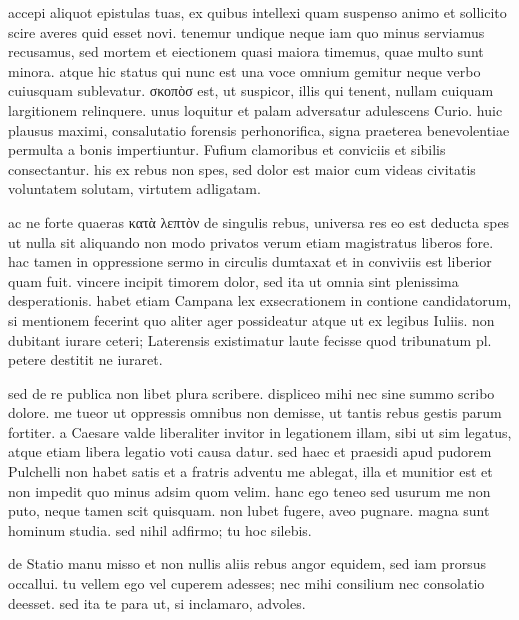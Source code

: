 


 accepi aliquot epistulas tuas, ex quibus intellexi quam suspenso animo et sollicito scire averes quid esset novi. tenemur undique neque iam quo minus serviamus recusamus, sed mortem et eiectionem quasi maiora timemus, quae multo sunt minora. atque hic status qui nunc est una voce omnium gemitur neque verbo cuiusquam sublevatur. σκοπὸσ est, ut suspicor, illis qui tenent, nullam cuiquam largitionem relinquere. unus loquitur et palam adversatur adulescens Curio. huic plausus maximi, consalutatio forensis perhonorifica, signa praeterea benevolentiae permulta a bonis impertiuntur. Fufium clamoribus et conviciis et sibilis consectantur. his ex rebus non spes, sed dolor est maior cum videas civitatis voluntatem solutam, virtutem adligatam.

 ac ne forte quaeras κατὰ λεπτὸν de singulis rebus, universa res eo est deducta spes ut nulla sit aliquando non modo privatos verum etiam magistratus liberos fore. hac tamen in oppressione sermo in circulis dumtaxat et in conviviis est liberior quam fuit. vincere incipit timorem dolor, sed ita ut omnia sint plenissima desperationis. habet etiam Campana lex exsecrationem in contione candidatorum, si mentionem fecerint quo aliter ager possideatur atque ut ex legibus Iuliis. non dubitant iurare ceteri; Laterensis existimatur laute fecisse quod tribunatum pl. petere destitit ne iuraret.

 sed de re publica non libet plura scribere. displiceo mihi nec sine summo scribo dolore. me tueor ut oppressis omnibus non demisse, ut tantis rebus gestis parum fortiter. a Caesare valde liberaliter invitor in legationem illam, sibi ut sim legatus, atque etiam libera legatio voti causa datur. sed haec et praesidi apud pudorem Pulchelli non habet satis et a fratris adventu me ablegat, illa et munitior est et non impedit quo minus adsim quom velim. hanc ego teneo sed usurum me non puto, neque tamen scit quisquam. non lubet fugere, aveo pugnare. magna sunt hominum studia. sed nihil adfirmo; tu hoc silebis.

 de Statio manu misso et non nullis aliis rebus angor equidem, sed iam prorsus occallui. tu vellem ego vel cuperem adesses; nec mihi consilium nec consolatio deesset. sed ita te para ut, si inclamaro, advoles.
